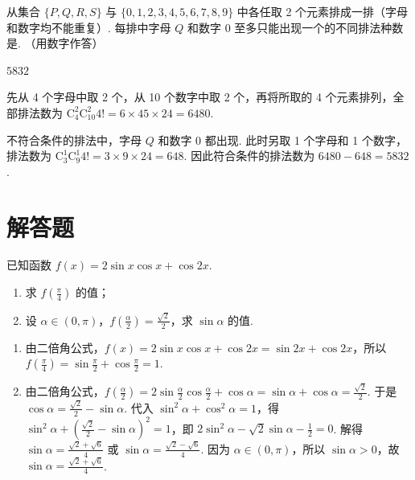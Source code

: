 \begin{problem}
从集合 \(\{P, Q, R, S\}\) 与 \(\{0, 1, 2, 3, 4, 5, 6, 7, 8, 9\}\) 中各任取 2 个元素排成一排（字母和数字均不能重复）. 每排中字母 \(Q\) 和数字 \(0\) 至多只能出现一个的不同排法种数是\fillinblank{}. （用数字作答）

\begin{answer}
\(5832\)
\end{answer}

\begin{solution}
先从 4 个字母中取 2 个，从 10 个数字中取 2 个，再将所取的 4 个元素排列，全部排法数为
\(\mathrm C_4^2\mathrm C_{10}^2 4!=6\times45\times24=6480\).

不符合条件的排法中，字母 \(Q\) 和数字 \(0\) 都出现. 此时另取 1 个字母和 1 个数字，排法数为
\(\mathrm C_3^1\mathrm C_9^1 4!=3\times9\times24=648\). 因此符合条件的排法数为 \(6480-648=5832\).
\end{solution}
\end{problem}

\section{解答题}
\begin{problem}
已知函数 \( f(x) = 2\sin x\cos x + \cos 2x \).
\begin{enumerate}
\item 求 \( f\left(\frac{\pi}{4}\right) \) 的值；
\item 设 \(\alpha \in (0, \pi)\)，\(f\left(\frac{\alpha}{2}\right) = \frac{\sqrt{2}}{2}\)，求 \(\sin \alpha\) 的值.
\end{enumerate}

\begin{solution}
\begin{enumerate}
\item 由二倍角公式，\(f(x)=2\sin x\cos x+\cos 2x=\sin 2x+\cos 2x\)，所以 \(f\left(\frac{\pi}{4}\right)=\sin\frac{\pi}{2}+\cos\frac{\pi}{2}=1\).

\item 由二倍角公式，\(f\left(\frac{\alpha}{2}\right)=2\sin\frac{\alpha}{2}\cos\frac{\alpha}{2}+\cos\alpha=\sin\alpha+\cos\alpha=\frac{\sqrt{2}}{2}\). 于是 \(\cos\alpha=\frac{\sqrt{2}}{2}-\sin\alpha\). 代入 \(\sin^2\alpha+\cos^2\alpha=1\)，得 \(\sin^2\alpha+\left(\frac{\sqrt{2}}{2}-\sin\alpha\right)^2=1\)，即 \(2\sin^2\alpha-\sqrt{2}\sin\alpha-\frac{1}{2}=0\). 解得 \(\sin\alpha=\frac{\sqrt{2}+\sqrt{6}}{4}\) 或 \(\sin\alpha=\frac{\sqrt{2}-\sqrt{6}}{4}\). 因为 \(\alpha\in(0,\pi)\)，所以 \(\sin\alpha>0\)，故 \(\sin\alpha=\frac{\sqrt{2}+\sqrt{6}}{4}\).
\end{enumerate}
\end{solution}
\end{problem}

